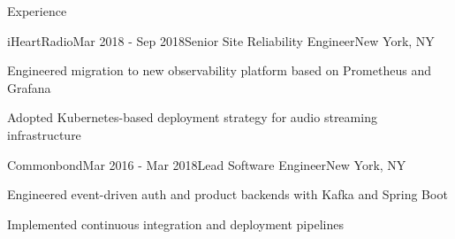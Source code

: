 \documentclass[
	11pt, %
]{resume} %
\begin{document}
\begin{rSection}{Experience}

    \begin{rSubsection}{iHeartRadio}{Mar 2018 - Sep 2018}{Senior Site Reliability Engineer}{New York, NY}
        \item Engineered migration to new observability platform based on Prometheus and Grafana
        \item Adopted Kubernetes-based deployment strategy for audio streaming infrastructure
    \end{rSubsection}


    \begin{rSubsection}{Commonbond}{Mar 2016 - Mar 2018}{Lead Software Engineer}{New York, NY}
        \item Engineered event-driven auth and product backends with Kafka and Spring Boot
        \item Implemented continuous integration and deployment pipelines
    \end{rSubsection}

\end{rSection}





\end{document}
